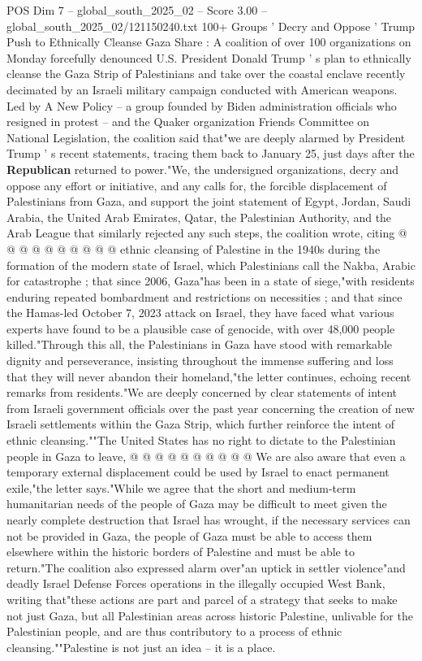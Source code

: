 \begin{textsample}{POS Dim 7 – global\_south\_2025\_02 – Score 3.00 – global\_south\_2025\_02/121150240.txt}  \label{ex:f7_pos_422}
100+ Groups ' Decry and Oppose ' Trump Push to Ethnically Cleanse Gaza Share : A coalition of over 100 organizations on Monday forcefully denounced U.S.
President Donald Trump ' s plan to ethnically cleanse the Gaza Strip of Palestinians and take over the coastal enclave recently decimated by an Israeli military campaign conducted with American weapons.
Led by A New Policy -- a group founded by Biden administration officials who resigned in protest -- and the Quaker organization Friends Committee on National Legislation, the coalition said that"we are deeply alarmed by President Trump ' s recent statements, tracing them back to January 25, just days after the \textbf{Republican} returned to power."We, the undersigned organizations, decry and oppose any effort or initiative, and any calls for, the forcible displacement of Palestinians from Gaza, and support the joint statement of Egypt, Jordan, Saudi Arabia, the United Arab Emirates, Qatar, the Palestinian Authority, and the Arab League that similarly rejected any such steps, the coalition wrote, citing @ @ @ @ @ @ @ @ @ @ ethnic cleansing of Palestine in the 1940s during the formation of the modern state of Israel, which Palestinians call the Nakba, Arabic for catastrophe ; that since 2006, Gaza"has been in a state of siege,"with residents enduring repeated bombardment and restrictions on necessities ; and that since the Hamas-led October 7, 2023 attack on Israel, they have faced what various experts have found to be a plausible case of genocide, with over 48,000 people killed."Through this all, the Palestinians in Gaza have stood with remarkable dignity and perseverance, insisting throughout the immense suffering and loss that they will never abandon their homeland,"the letter continues, echoing recent remarks from residents."We are deeply concerned by clear statements of intent from Israeli government officials over the past year concerning the creation of new Israeli settlements within the Gaza Strip, which further reinforce the intent of ethnic cleansing.""The United States has no right to dictate to the Palestinian people in Gaza to leave, @ @ @ @ @ @ @ @ @ @ We are also aware that even a temporary external displacement could be used by Israel to enact permanent exile,"the letter says."While we agree that the short and medium-term humanitarian needs of the people of Gaza may be difficult to meet given the nearly complete destruction that Israel has wrought, if the necessary services can not be provided in Gaza, the people of Gaza must be able to access them elsewhere within the historic borders of Palestine and must be able to return."The coalition also expressed alarm over"an uptick in settler violence"and deadly Israel Defense Forces operations in the illegally occupied West Bank, writing that"these actions are part and parcel of a strategy that seeks to make not just Gaza, but all Palestinian areas across historic Palestine, unlivable for the Palestinian people, and are thus contributory to a process of ethnic cleansing.""Palestine is not just an idea -- it is a place.

\end{textsample}
